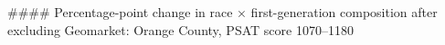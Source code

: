 #### Percentage-point change in race × first-generation composition after excluding Geomarket: Orange County, PSAT score 1070–1180
